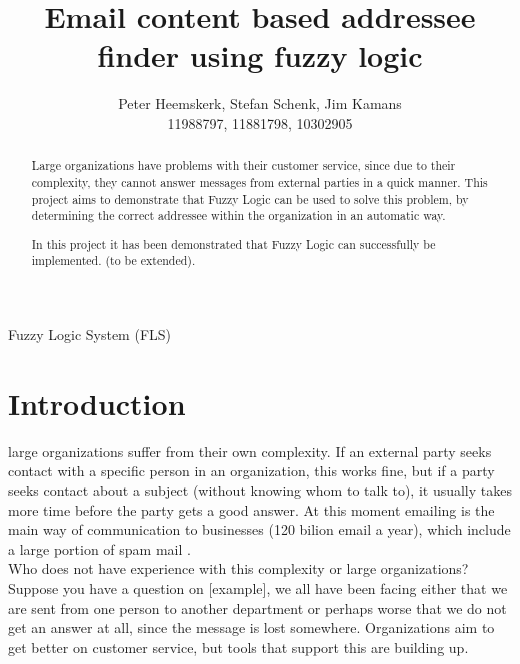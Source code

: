 \documentclass[journal]{IEEEtran}
\begin{document}
\title{Email content based addressee finder using fuzzy logic}
\author{Peter Heemskerk, Stefan Schenk, Jim Kamans\\11988797, 11881798, 10302905}


\maketitle

\begin{abstract}
Large organizations have problems with their customer service, since due to their complexity, they cannot answer messages from external parties in a quick manner. This project aims to demonstrate that Fuzzy Logic can be used to solve this problem, by determining the correct addressee within the organization in an automatic way.

In this project it has been demonstrated that Fuzzy Logic can successfully be implemented. (to be extended).
\end{abstract}

\begin{IEEEkeywords}
Fuzzy Logic System (FLS)
\end{IEEEkeywords}

\section{Introduction}
 large organizations suffer from their own complexity. If an external party seeks contact with a specific person in an organization, this works fine, but if a party seeks contact about a subject (without knowing whom to talk to), it usually takes more time before the party gets a good answer. At this moment emailing is the main way of communication to businesses (120 bilion email a year), which include a large portion of spam mail \cite{email_statistics}.\\

Who does not have experience with this complexity or large organizations? Suppose you have a question on [example], we all have been facing either that we are sent from one person to another department or perhaps worse that we do not get an answer at all, since the message is lost somewhere. Organizations aim to get better on customer service, but tools that support this are building up. 
\end{document}
